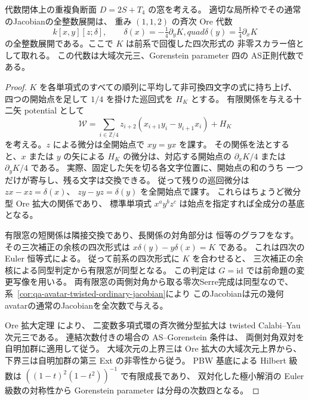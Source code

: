 \begin{theorem}[重複負断面の十二矢JacobianのOre表示]
\label{thm:qa-avatar-double-negative-ore}
代数閉体上の重複負断面 $D=2S+T_4$ の窓を考える。
適切な局所枠でその通常のJacobianの全整数展開は、
重み $(1,1,2)$ の斉次 Ore 代数
\[
 k[x,y][z;\delta],\qquad
 \delta(x)=-\tfrac14\partial_y K,quad
 \delta(y)=\tfrac14\partial_x K
\]
の全整数展開である。ここで $K$ は前系で回復した四次形式の
非零スカラー倍として取れる。
この代数は大域次元三、Gorenstein parameter 四の
AS正則代数である。
\end{theorem}
\begin{proof}
$K$ を各単項式のすべての順列に平均して非可換四文字の式に持ち上げ、
四つの開始点を足して $1/4$ を掛けた巡回式を $H_K$ とする。
有限関係を与える十二矢 potential として
\[
 \mathcal W=
 \sum_{i\in\mathbb Z/4}z_{i+2}
            (x_{i+1}y_i-y_{i+1}x_i)+H_K
\]
を考える。$z$ による微分は全開始点で $xy=yx$ を課す。
その関係を法とすると、$x$ または $y$ の矢による
$H_K$ の微分は、対応する開始点の
$\partial_x K/4$ または $\partial_y K/4$ である。
実際、固定した矢を切る各文字位置に、開始点の和のうち
一つだけが寄与し、残る文字は交換できる。
従って残りの巡回微分は $zx-xz=\delta(x)$、
$zy-yz=\delta(y)$ を全開始点で課す。
これらはちょうど微分型 Ore 拡大の関係であり、
標準単項式 $x^a y^b z^c$ は始点を指定すれば全成分の基底となる。

有限窓の短関係は隣接交換であり、長関係の対角部分は
恒等のグラフをなす。その三次補正の余核の四次形式は
$x\delta(y)-y\delta(x)=K$ である。
これは四次の Euler 恒等式による。
従って前系の四次形式に $K$ を合わせると、
三次補正の余核による同型判定から有限窓が同型となる。
この判定は $G=\mathrm{id}$ では前命題の変更写像を用いる。
両有限窓の両側対角から取る零次Serre完成は同型なので、
系~\ref{cor:qa-avatar-twisted-ordinary-jacobian}により
このJacobianは元の幾何avatarの通常のJacobianを全次数で与える。

Ore 拡大定理 \cite[Theorem 3.3]{LWW2014} により、
二変数多項式環の斉次微分型拡大は twisted Calabi--Yau 次元三である。
連結次数付きの場合の AS--Gorenstein 条件は、
両側対角双対を自明加群に適用して従う。
大域次元の上界三は Ore 拡大の大域次元上界から、
下界三は自明加群の第三 Ext の非零性から従う。
PBW 基底による Hilbert 級数は
$((1-t)^2(1-t^2))^{-1}$ で有限成長であり、
双対化した極小解消の Euler 級数の対称性から
Gorenstein parameter は分母の次数四となる。
\end{proof}


